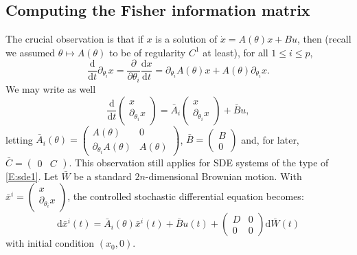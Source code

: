 \documentclass[twocolumn]{autart}
\theoremstyle{definition}
\theoremstyle{remark}
\newcommand{\diff}{\mathrm{d}}
\begin{document}
\subsection{Computing the Fisher information matrix}\label{S:computing-FIM}

The crucial observation is that if $x$ is a solution of $\dot x=A(\theta) x+Bu$, then (recall we assumed $\theta\mapsto A(\theta)$ to be of regularity $C^1$ at least), for all $1\leq i\leq p$,
$$
\frac{\diff}{\diff t} \partial_{\theta_i} x= \frac{\partial}{\partial \theta_i} \frac{\diff x}{\diff t}= \partial_{\theta_i} A(\theta)x + A(\theta) \partial_{\theta_i} x.
$$
We may write as well
$$
\frac{\diff}{\diff t}
\begin{pmatrix}
x
\\
\partial_{\theta_i} x
\end{pmatrix}
=
\bar A_i
\begin{pmatrix}
x
\\
\partial_{\theta_i} x
\end{pmatrix}
+
\bar B u,
$$
letting 
$\bar A_i(\theta)=\begin{pmatrix}
    A(\theta) & 0
    \\
    \partial_{\theta_i}A(\theta) & A(\theta)
\end{pmatrix}$,
$\bar B=\begin{pmatrix}
    B
    \\
    0
    \end{pmatrix}$ and, for later, $\bar C=\begin{pmatrix}
0&C
\end{pmatrix}$.
This observation still applies for SDE systems of the type of \eqref{E:sde1}.
Let $\bar W$ be a standard $2n$-dimensional Brownian motion. With $\bar x^i=\begin{pmatrix}
x
\\
\partial_{\theta_i} x
\end{pmatrix}$,
the controlled stochastic differential equation becomes:
\begin{equation}\label{E:sde2}
\diff \bar x^i(t)
=
\bar A_i(\theta)
\bar x^i(t)
+
\bar B u(t)
+
\begin{pmatrix}
D & 0
\\
0 & 0
\end{pmatrix}\diff \bar W(t)
\end{equation}
with initial condition $(x_0,0)$.
\end{document}
